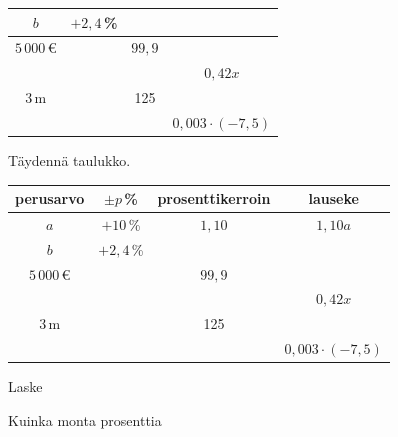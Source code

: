 \begin{tehtavasivu}
\begin{tabular}{|c|c|c|c|}
$b$ & $+2,4$\,\% & & \\ 
\hline 
$5\,000$\,€ & & $99,9$ & \\ 
\hline 
 & & & $0,42x$ \\ 
\hline 
 $3$\,m& & 125 & \\ 
 \hline
  & & &$0,003\cdot(-7,5)$ \\
  \hline
\end{tabular}
\begin{tehtava}
Täydennä taulukko.
\begin{tabular}{|c|c|c|c|}
\hline 
perusarvo & $\pm p$\,\% & prosenttikerroin & lauseke \\ 
\hline 
$a$ & $+10$\,\% & $1,10$ & $1,10a$ \\ 
\hline 
$b$ & $+2,4$\,\% & & \\ 
\hline 
$5\,000$\,€ & & $99,9$ & \\ 
\hline 
 & & & $0,42x$ \\ 
\hline 
 $3$\,m& & 125 & \\ 
 \hline
  & & &$0,003\cdot(-7,5)$ \\
  \hline
\end{tabular}

\begin{vastaus}

\end{vastaus}

\end{tehtava}




\begin{tehtava}
    Laske
    \begin{vastaus}
    \end{vastaus}
\end{tehtava}

\begin{tehtava}
    Kuinka monta prosenttia
    \begin{vastaus}
    \end{vastaus}
\end{tehtava}



\end{tehtavasivu}
